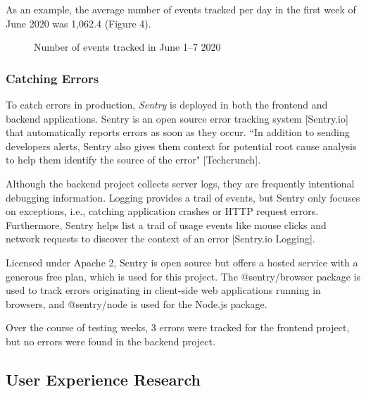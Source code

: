 \documentclass{article}
\begin{document}
As an example, the average number of events tracked per day in the first week of June 2020 was 1,062.4 (Figure 4).

\begin{figure}
\centering
{}
\caption{Number of events tracked in June 1–7 2020}
\end{figure}

\subsubsection{Catching Errors}

To catch errors in production, \emph{Sentry} is deployed in both the frontend and backend applications. Sentry is an open source error tracking system [Sentry.io] that automatically reports errors as soon as they occur. ``In addition to sending developers alerts, Sentry also gives them context for potential root cause analysis to help them identify the source of the error" [Techcrunch].

Although the backend project collects server logs, they are frequently intentional debugging information. Logging provides a trail of events, but Sentry only focuses on exceptions, i.e., catching application crashes or HTTP request errors. Furthermore, Sentry helps list a trail of usage events like mouse clicks and network requests to discover the context of an error [Sentry.io Logging].

Licensed under Apache 2, Sentry is open source but offers a hosted service with a generous free plan, which is used for this project. The @sentry/browser package is used to track errors originating in client-side web applications running in browsers, and @sentry/node is used for the Node.js package.

Over the course of testing weeks, 3 errors were tracked for the frontend project, but no errors were found in the backend project.

\subsection{User Experience Research}
\end{document}
